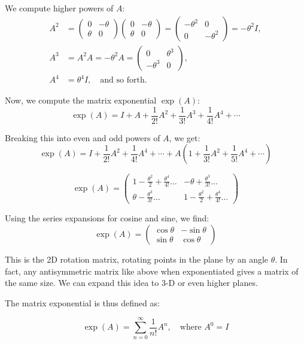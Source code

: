 \documentclass{article}
\begin{document}
We compute higher powers of \(A\):
\begin{align*}
A^2 &= \begin{pmatrix}
0 & -\theta \\
\theta & 0
\end{pmatrix}
\begin{pmatrix}
0 & -\theta \\
\theta & 0
\end{pmatrix}
= \begin{pmatrix}
-\theta^2 & 0 \\
0 & -\theta^2
\end{pmatrix} = -\theta^2 I, \\
A^3 &= A^2A = -\theta^2 A = \begin{pmatrix}
0 & \theta^3 \\
-\theta^3 & 0
\end{pmatrix}, \\
A^4 &= \theta^4 I, \quad \text{and so forth.}
\end{align*}

Now, we compute the matrix exponential \(\exp(A)\):
\[
\exp(A) = I + A + \frac{1}{2!}A^2 + \frac{1}{3!}A^3 + \frac{1}{4!}A^4 + \cdots
\]

Breaking this into even and odd powers of \(A\), we get:
\[
\exp(A) = I + \frac{1}{2!}A^2 + \frac{1}{4!}A^4 + \cdots + A\left(1 + \frac{1}{3!}A^2 + \frac{1}{5!}A^4 + \cdots\right)
\]

\[
\exp(A) = \begin{pmatrix}
1 - \frac{\theta^2}{2} + \frac{\theta^4}{4!} \dots & -\theta + \frac{\theta^3}{3!} \dots\\
\theta - \frac{\theta^3}{3!} \dots & 1 - \frac{\theta^2}{2} + \frac{\theta^4}{4!} \dots
\end{pmatrix}
\]

Using the series expansions for cosine and sine, we find:
\[
\exp(A) = \begin{pmatrix}
\cos\theta & -\sin\theta \\
\sin\theta & \cos\theta
\end{pmatrix}
\]

This is the 2D rotation matrix, rotating points in the plane by an angle \(\theta\).
In fact, any antisymmetric matrix like above when exponentiated gives a matrix of the same size. We can expand this idea to 3-D or even higher planes. 

The matrix exponential is thus defined as:

\begin{theorem}
\[
\exp(A) = \sum_{n=0}^{\infty} \frac{1}{n!} A^n, \quad \text{where } A^0 = I
\]   
\end{theorem}
\end{document}
